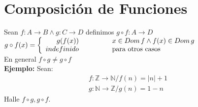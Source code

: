 \section{Composición de Funciones}
Sean $f:A\rightarrow B \land g:C\rightarrow D$ definimos $g\circ f: A\rightarrow D$\\



$g\circ f(x)= \left \{  \begin{array}{rp{1cm}l} g(f(x)) & &x\in Dom\, f \land f(x)\in Dom\, g
				\\	indefinido & &\mbox{para otros casos}\end{array}\right.$\\

En general $f\circ g\not=g\circ f$\\

\textbf{Ejemplo: }Sean: $$\begin{array}{l} f:\mathds{Z}\rightarrow \mathds{N}/f(n)=|n|+1 \\
										g:\mathds{N}\rightarrow\mathds{Z}/g(n)=1-n\end{array}$$
Halle $f\circ g, g\circ f$.